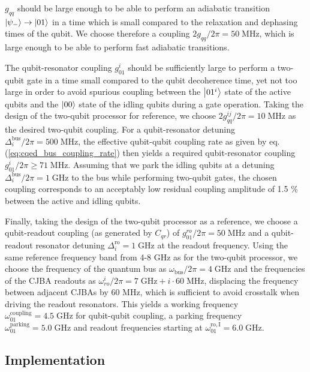 \smallskip

$g_{qq}$ should be large enough to be able to perform an adiabatic transition $\left| \psi_- \right>\to\left| 01 \right>$ in a time which is small compared to the relaxation and dephasing times of the qubit. We choose therefore a coupling $2g_{qq}/2\pi = 50\;\mathrm{MHz}$, which is large enough to be able to perform fast adiabatic transitions.

\smallskip

The qubit-resonator coupling $g_{01}^i$ should be sufficiently large to perform a two-qubit gate in a time small compared to the qubit decoherence time, yet not too large in order to avoid spurious coupling between the $\left| 01^i \right>$ state of the active qubits and the $\left| 00 \right>$ state of the idling qubits during a gate operation. Taking the design of the two-qubit processor for reference, we choose $2g_{qq}^{ij}/2\pi = 10\;\mathrm{MHz}$ as the desired two-qubit coupling. For a qubit-resonator detuning $\Delta_i^\mathrm{bus}/2\pi=500\;\mathrm{MHz}$, the effective qubit-qubit coupling rate as given by eq. (\ref{eq:cqed_bus_coupling_rate}) then yields a required qubit-resonator coupling $g_{01}^i/2\pi\ge 71\;\mathrm{MHz}$. Assuming that we park the idling qubits at a detuning $\Delta_i^\mathrm{bus}/2\pi = 1\;\mathrm{GHz}$ to the bus while performing two-qubit gates, the chosen coupling corresponds to an acceptably low residual coupling amplitude of 1.5 \% between the active and idling qubits.

\smallskip

Finally, taking the design of the two-qubit processor as a reference, we choose a qubit-readout coupling (as generated by $C_{qr}$) of $g_{01}^{ro}/2\pi = 50\;\mathrm{MHz}$ and a qubit-readout resonator detuning $\Delta_i^\mathrm{ro}=1\;\mathrm{GHz}$ at the readout frequency. Using the same reference frequency band from 4-8 GHz as for the two-qubit processor, we choose the frequency of the quantum bus as $\omega_\mathrm{bus}/2\pi=4\;\mathrm{GHz}$ and the frequencies of the CJBA readouts as $\omega_{ro}^i/2\pi=7\;\mathrm{GHz}+i\cdot 60\;\mathrm{MHz}$, displacing the frequency between adjacent CJBAs by 60 MHz, which is sufficient to avoid crosstalk when driving the readout resonators. This yields a working frequency $\omega_{01}^\mathrm{coupling}=4.5\;\mathrm{GHz}$ for qubit-qubit coupling, a parking frequency $\omega_{01}^\mathrm{parking}=5.0\;\mathrm{GHz}$ and readout frequencies starting at $\omega_{01}^\mathrm{ro,I}=6.0\;\mathrm{GHz}$.

\subsection{Implementation}


